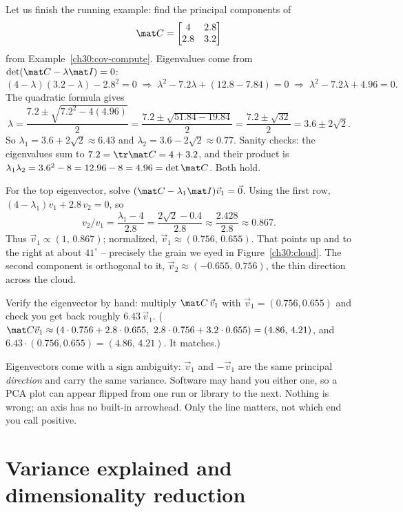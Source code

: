 Let us finish the running example: find the principal components of
\[
  \mat C=\begin{bmatrix}4 & 2.8\\ 2.8 & 3.2\end{bmatrix}
\]
from Example~\ref{ch30:cov-compute}. Eigenvalues come from
$\det(\mat C-\lambda\mat I)=0$:
\[
  (4-\lambda)(3.2-\lambda)-2.8^2=0
  \;\Longrightarrow\;
  \lambda^2-7.2\lambda+(12.8-7.84)=0
  \;\Longrightarrow\;
  \lambda^2-7.2\lambda+4.96=0 .
\]
The quadratic formula gives
\[
  \lambda=\frac{7.2\pm\sqrt{7.2^2-4(4.96)}}{2}
        =\frac{7.2\pm\sqrt{51.84-19.84}}{2}
        =\frac{7.2\pm\sqrt{32}}{2}
        =3.6\pm 2\sqrt2 .
\]
So $\lambda_1=3.6+2\sqrt2\approx 6.43$ and $\lambda_2=3.6-2\sqrt2\approx 0.77$.
Sanity checks: the eigenvalues sum to $7.2=\tr\mat C=4+3.2$, and their product is
$\lambda_1\lambda_2=3.6^2-8=12.96-8=4.96=\det\mat C$. Both hold.

For the top eigenvector, solve $(\mat C-\lambda_1\mat I)\vec v_1=\vec 0$. Using the
first row, $(4-\lambda_1)v_{1}+2.8\,v_{2}=0$, so
\[
  v_2/v_1=\frac{\lambda_1-4}{2.8}=\frac{2\sqrt2-0.4}{2.8}\approx\frac{2.428}{2.8}
  \approx0.867 .
\]
Thus $\vec v_1\propto(1,\,0.867)$; normalized, $\vec v_1\approx(0.756,\,0.655)$.
That points up and to the right at about $41^\circ$ -- precisely the grain we eyed
in Figure~\ref{ch30:cloud}. The second component is orthogonal to it,
$\vec v_2\approx(-0.655,\,0.756)$, the thin direction across the cloud.

\begin{labbox}
Verify the eigenvector by hand: multiply $\mat C\,\vec v_1$ with
$\vec v_1=(0.756,0.655)$ and check you get back roughly $6.43\,\vec v_1$.
($\mat C\vec v_1\approx(4\cdot0.756+2.8\cdot0.655,\ 2.8\cdot0.756+3.2\cdot0.655)
=(4.86,\,4.21)$, and $6.43\cdot(0.756,0.655)=(4.86,\,4.21)$. It matches.)
\end{labbox}

\begin{trapbox}
Eigenvectors come with a sign ambiguity: $\vec v_1$ and $-\vec v_1$ are the same
principal \emph{direction} and carry the same variance. Software may hand you
either one, so a PCA plot can appear flipped from one run or library to the next.
Nothing is wrong; an axis has no built-in arrowhead. Only the line matters, not
which end you call positive.
\end{trapbox}

\section{Variance explained and dimensionality reduction}

